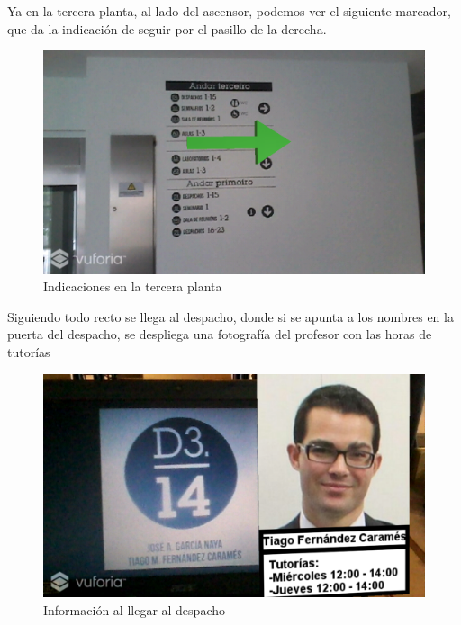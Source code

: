 \documentclass[12pt, a4paper, titlepage]{article}
\begin{document}
	Ya en la tercera planta, al lado del ascensor, podemos ver el siguiente marcador, que da la indicación de seguir por el pasillo de la derecha.
	
	\begin{figure}[h!]
		\begin{center}
			\includegraphics[width=13cm]{img/flechaderecha.png}
			\caption{Indicaciones en la tercera planta}
		\end{center}
	\end{figure}
	
	\clearpage

Siguiendo todo recto se llega al despacho, donde si se apunta a los nombres en la puerta del despacho, se despliega una fotografía del profesor con las horas de tutorías

	\begin{figure}[h!]
		\begin{center}
			\includegraphics[width=14cm]{img/tutorias.png}
			\caption{Información al llegar al despacho}
		\end{center}
	\end{figure}
\end{document}
